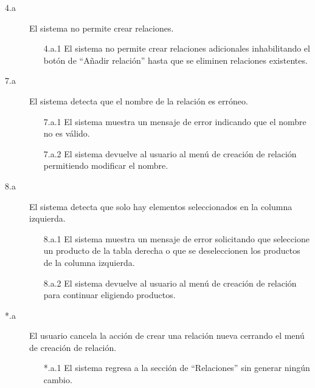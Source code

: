 \begin{description}

    \item[4.a] El sistema no permite crear relaciones.
    \begin{enumerate}
        \item[4.a.1] El sistema no permite crear relaciones adicionales inhabilitando el botón de \enquote{Añadir relación} hasta que se eliminen relaciones existentes.
    \end{enumerate}
    
    \item[7.a] El sistema detecta que el nombre de la relación es erróneo.
    \begin{enumerate}
        \item[7.a.1] El sistema muestra un mensaje de error indicando que el nombre no es válido.
        \item[7.a.2] El sistema devuelve al usuario al menú de creación de relación permitiendo modificar el nombre.
    \end{enumerate}
    
    \item[8.a] El sistema detecta que solo hay elementos seleccionados en la columna izquierda.
    \begin{enumerate}
        \item[8.a.1] El sistema muestra un mensaje de error solicitando que seleccione un producto de la tabla derecha o que se deseleccionen los productos de la columna izquierda.
        \item[8.a.2] El sistema devuelve al usuario al menú de creación de relación para continuar eligiendo productos.
    \end{enumerate}

    \item[*.a] El usuario cancela la acción de crear una relación nueva cerrando el menú de creación de relación.
    \begin{enumerate}
        \item[*.a.1] El sistema regresa a la sección de \enquote{Relaciones} sin generar ningún cambio.
    \end{enumerate}
\end{description}

